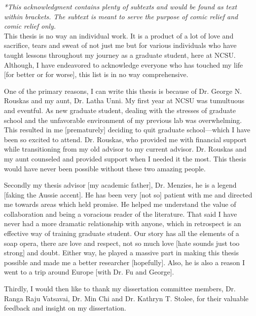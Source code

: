 \textit{*This acknowledgment contains plenty of subtexts and would be found as text within brackets. The subtext is meant to serve the purpose of comic relief and comic relief only.} \\

This thesis is no way an individual work. It is a product of a lot of love and sacrifice, tears and sweat of not just me but for various individuals who have taught lessons throughout my journey as a graduate student, here at NCSU. Although, I have endeavored to acknowledge everyone who has touched my life [for better or for worse], this list is in no way comprehensive. 

One of the primary reasons, I can write this thesis is because of Dr. George N. Rouskas and my aunt, Dr. Latha Unni. 
My first year at NCSU was tumultuous and eventful. As new graduate student, dealing with the stresses of graduate school and the unfavorable environment of my previous lab was overwhelming. This resulted in me [prematurely] deciding to quit graduate school---which I have been so excited to attend. Dr. Rouskas, who provided me with financial support while transitioning from my old advisor to my current advisor. Dr. Rouskas and my aunt counseled and provided support when I needed it the most. This thesis would have never been possible without these two amazing people. 

Secondly my thesis advisor [my academic father], Dr. Menzies, he is a legend [faking the
Aussie accent]. He has been very [not so] patient with me and directed me towards areas which
held promise. He helped me understand the value of collaboration and being a voracious reader
of the literature. That said I have never had a more dramatic relationship with anyone, which
in retrospect is an effective way of training graduate student. Our story has all the elements
of a soap opera, there are love and respect, not so much love [hate sounds just too strong] and
doubt. Either way, he played a massive part in making this thesis possible and made me a better
researcher [hopefully]. Also, he is also a reason I went to a trip around Europe [with Dr. Fu and George].

Thirdly, I would then like to thank my dissertation committee members,
Dr. Ranga Raju Vatsavai, Dr. Min Chi and Dr. Kathryn T. Stolee,
for their valuable feedback and insight on my dissertation.

